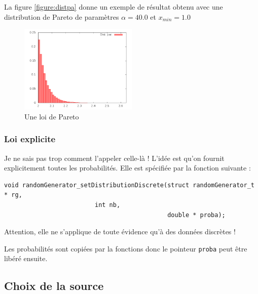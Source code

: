    La figure \ref{figure:distpa} donne un exemple de résultat obtenu
avec une distribution de Pareto de paramètres $\alpha = 40.0$ et
$x_{min} = 1.0$

\begin{figure}[h]
\begin{center}
\includegraphics[width=0.5\textwidth]{DistributionPar.png}
\caption{Une loi de Pareto\label{figure:distpar}}
\end{center}
\end{figure}
%
\subsubsection{Loi  explicite}

   Je ne sais pas trop comment l'appeler celle-là ! L'idée est qu'on
fournit explicitement toutes les probabilités. Elle est spécifiée par
la fonction suivante :

\begin{verbatim}
void randomGenerator_setDistributionDiscrete(struct randomGenerator_t * rg,
					     int nb,
                                             double * proba);
\end{verbatim}

   Attention, elle ne s'applique de toute évidence qu'à des données
discrètes !

   Les probabilités sont copiées par la fonctions donc le pointeur
{\tt proba} peut être libéré ensuite.

%
\subsection{Choix de la source}

